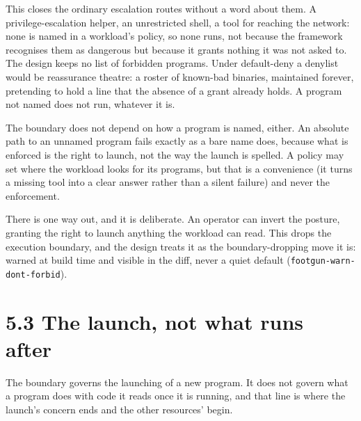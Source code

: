 This closes the ordinary escalation routes without a word about them. A
privilege-escalation helper, an unrestricted shell, a tool for reaching
the network: none is named in a workload's policy, so none runs, not
because the framework recognises them as dangerous but because it grants
nothing it was not asked to. The design keeps no list of forbidden
programs. Under default-deny a denylist would be reassurance theatre: a
roster of known-bad binaries, maintained forever, pretending to hold a
line that the absence of a grant already holds. A program not named does
not run, whatever it is.

The boundary does not depend on how a program is named, either. An
absolute path to an unnamed program fails exactly as a bare name does,
because what is enforced is the right to launch, not the way the launch
is spelled. A policy may set where the workload looks for its programs,
but that is a convenience (it turns a missing tool into a clear answer
rather than a silent failure) and never the enforcement.

There is one way out, and it is deliberate. An operator can invert the
posture, granting the right to launch anything the workload can read.
This drops the execution boundary, and the design treats it as the
boundary-dropping move it is: warned at build time and visible in the
diff, never a quiet default (\texttt{footgun-warn-dont-forbid}).

\hypertarget{the-launch-not-what-runs-after}{%
\section{5.3 The launch, not what runs
after}\label{the-launch-not-what-runs-after}}

The boundary governs the launching of a new program. It does not govern
what a program does with code it reads once it is running, and that line
is where the launch's concern ends and the other resources' begin.

